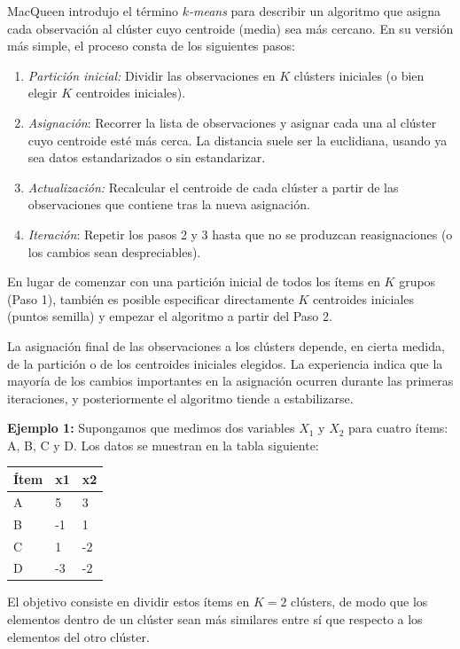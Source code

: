 \documentclass[
]{book}
\begin{document}
MacQueen introdujo el término \emph{\(k\)-means} para describir un algoritmo que asigna cada observación al clúster cuyo centroide (media) sea más cercano. En su versión más simple, el proceso consta de los siguientes pasos:

\begin{enumerate}
\def\labelenumi{\arabic{enumi})}
\item
  \emph{Partición inicial:} Dividir las observaciones en \(K\) clústers iniciales (o bien elegir \(K\) centroides iniciales).
\item
  \emph{Asignación}: Recorrer la lista de observaciones y asignar cada una al clúster cuyo centroide esté más cerca. La distancia suele ser la euclidiana, usando ya sea datos estandarizados o sin estandarizar.
\item
  \emph{Actualización:} Recalcular el centroide de cada clúster a partir de las observaciones que contiene tras la nueva asignación.
\item
  \emph{Iteración}: Repetir los pasos 2 y 3 hasta que no se produzcan reasignaciones (o los cambios sean despreciables).
\end{enumerate}

En lugar de comenzar con una partición inicial de todos los ítems en \(K\) grupos (Paso 1), también es posible especificar directamente \(K\) centroides iniciales (puntos semilla) y empezar el algoritmo a partir del Paso 2.

La asignación final de las observaciones a los clústers depende, en cierta medida, de la partición o de los centroides iniciales elegidos. La experiencia indica que la mayoría de los cambios importantes en la asignación ocurren durante las primeras iteraciones, y posteriormente el algoritmo tiende a estabilizarse.

\textbf{Ejemplo 1:} Supongamos que medimos dos variables \(X_1\) y \(X_2\) para cuatro ítems: A, B, C y D. Los datos se muestran en la tabla siguiente:

\begin{longtable}[]{@{}lll@{}}
\toprule\noalign{}
Ítem & x1 & x2 \\
\midrule\noalign{}
\endhead
\bottomrule\noalign{}
\endlastfoot
A & 5 & 3 \\
B & -1 & 1 \\
C & 1 & -2 \\
D & -3 & -2 \\
\end{longtable}

El objetivo consiste en dividir estos ítems en \(K = 2\) clústers, de modo que los elementos dentro de un clúster sean más similares entre sí que respecto a los elementos del otro clúster.
\end{document}

